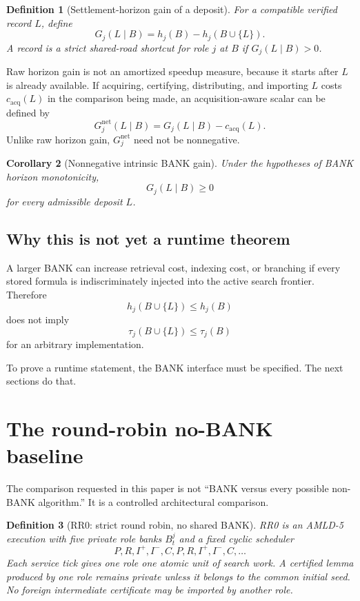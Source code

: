 \documentclass[11pt]{article}
\newtheorem{definition}{Definition}[section]
\newtheorem{corollary}[definition]{Corollary}
\begin{document}
\begin{definition}[Settlement-horizon gain of a deposit]
For a compatible verified record $L$, define
\[
G_j(L\mid B)=h_j(B)-h_j(B\cup\{L\}).
\]
A record is a \emph{strict shared-road shortcut} for role $j$ at $B$ if $G_j(L\mid B)>0$.
\end{definition}

Raw horizon gain is not an amortized speedup measure, because it starts after $L$ is already available. If acquiring, certifying, distributing, and importing $L$ costs $c_{\mathrm{acq}}(L)$ in the comparison being made, an acquisition-aware scalar can be defined by
\[
G_j^{\mathrm{net}}(L\mid B)=G_j(L\mid B)-c_{\mathrm{acq}}(L).
\]
Unlike raw horizon gain, $G_j^{\mathrm{net}}$ need not be nonnegative.

\begin{corollary}[Nonnegative intrinsic BANK gain]
Under the hypotheses of BANK horizon monotonicity,
\[
G_j(L\mid B)\ge0
\]
for every admissible deposit $L$.
\end{corollary}

\subsection{Why this is not yet a runtime theorem}

A larger BANK can increase retrieval cost, indexing cost, or branching if every stored formula is indiscriminately injected into the active search frontier. Therefore
\[
h_j(B\cup\{L\})\le h_j(B)
\]
does not imply
\[
\tau_j(B\cup\{L\})\le \tau_j(B)
\]
for an arbitrary implementation.

To prove a runtime statement, the BANK interface must be specified. The next sections do that.

\section{The round-robin no-BANK baseline}

The comparison requested in this paper is not ``BANK versus every possible non-BANK algorithm.'' It is a controlled architectural comparison.

\begin{definition}[RR0: strict round robin, no shared BANK]
RR0 is an AMLD-5 execution with five private role banks $B_t^j$ and a fixed cyclic scheduler
\[
P,R,I^+,I^-,C,P,R,I^+,I^-,C,\ldots
\]
Each service tick gives one role one atomic unit of search work. A certified lemma produced by one role remains private unless it belongs to the common initial seed. No foreign intermediate certificate may be imported by another role.
\end{definition}
\end{document}

